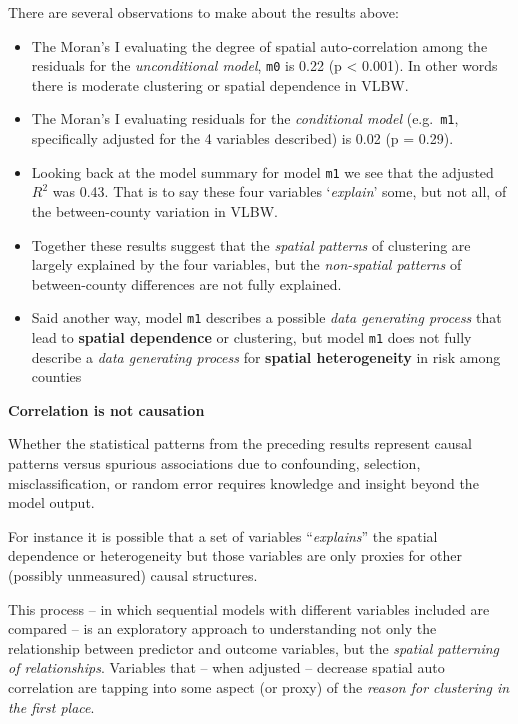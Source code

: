 \documentclass[
]{book}
\providecommand{\tightlist}{%
  \setlength{\itemsep}{0pt}\setlength{\parskip}{0pt}}
\newenvironment{rmdcaution}[1]
  {
  \begin{itemize}
  \renewcommand{\labelitemi}{
    \raisebox{-.7\height}[0pt][0pt]{
      {\setkeys{Gin}{width=3em,keepaspectratio}\texttt{[image: images/\#1]}}
    }
  }
  \setlength{\fboxsep}{1em}
  \begin{caution}
  \item
  }
  {
  \end{caution}
  \end{itemize}
  }
\begin{document}
There are several observations to make about the results above:

\begin{itemize}
\tightlist
\item
  The Moran's I evaluating the degree of spatial auto-correlation among the residuals for the \emph{unconditional model}, \texttt{m0} is 0.22 (p \textless{} 0.001). In other words there is moderate clustering or spatial dependence in VLBW.
\item
  The Moran's I evaluating residuals for the \emph{conditional model} (e.g.~\texttt{m1}, specifically adjusted for the 4 variables described) is 0.02 (p = 0.29).
\item
  Looking back at the model summary for model \texttt{m1} we see that the adjusted \(R^2\) was 0.43. That is to say these four variables `\emph{explain}' some, but not all, of the between-county variation in VLBW.
\item
  Together these results suggest that the \emph{spatial patterns} of clustering are largely explained by the four variables, but the \emph{non-spatial patterns} of between-county differences are not fully explained.
\item
  Said another way, model \texttt{m1} describes a possible \emph{data generating process} that lead to \textbf{spatial dependence} or clustering, but model \texttt{m1} does not fully describe a \emph{data generating process} for \textbf{spatial heterogeneity} in risk among counties
\end{itemize}

\begin{rmdcaution}{caution}
\textbf{Correlation is not causation}

Whether the statistical patterns from the preceding results represent causal patterns versus spurious associations due to confounding, selection, misclassification, or random error requires knowledge and insight beyond the model output.

For instance it is possible that a set of variables ``\emph{explains}'' the spatial dependence or heterogeneity but those variables are only proxies for other (possibly unmeasured) causal structures.

\end{rmdcaution}

This process -- in which sequential models with different variables included are compared -- is an exploratory approach to understanding not only the relationship between predictor and outcome variables, but the \emph{spatial patterning of relationships}. Variables that -- when adjusted -- decrease spatial auto correlation are tapping into some aspect (or proxy) of the \emph{reason for clustering in the first place}.
\end{document}
